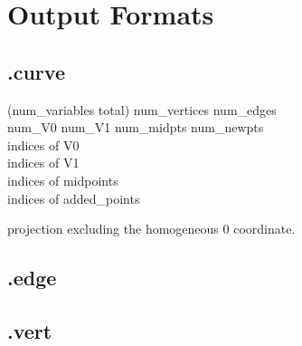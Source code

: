 \documentclass[10pt]{article}
\begin{document}
\section{Output Formats}


\subsection{.curve}


(num\_variables total) num\_vertices num\_edges \\
num\_V0 num\_V1 num\_midpts num\_newpts \\

indices of V0  \\
indices of V1  \\
indices of midpoints \\
indices of added\_points

projection excluding the homogeneous 0 coordinate.\\


\subsection{.edge}


\subsection{.vert}




%
%	
%	
%	
\end{document}
